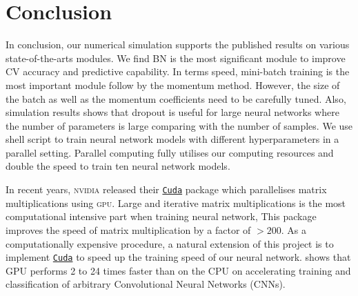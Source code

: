 \section{Conclusion}
In conclusion, our numerical simulation supports the published results on various state-of-the-arts modules. We find BN is the most significant module to improve CV accuracy and predictive capability. In terms speed, mini-batch training is the most important module follow by the momentum method. However, the size of the batch as well as the momentum coefficients need to be carefully tuned. Also, simulation results shows that dropout is useful for large neural networks where the number of parameters is large comparing with the number of samples. We use shell script to train neural network models with different hyperparameters in a parallel setting. Parallel computing fully utilises our computing resources and double the speed to train ten neural network models.

In recent years, \textsc{nvidia} released their \href{https://developer.nvidia.com/cuda-zone}{\texttt{Cuda}} package which parallelises matrix multiplications using \textsc{gpu}. Large and iterative matrix multiplications is the most computational intensive part when training neural network, This package improves the speed of matrix multiplication by a factor of $>200$. As a computationally expensive procedure, a natural extension of this project is to implement \href{https://developer.nvidia.com/cuda-zone}{\texttt{Cuda}} to speed up the training speed of our neural network. \citet{5452452} shows that GPU performs 2 to 24 times faster than on the CPU on accelerating training and classification of arbitrary Convolutional Neural Networks (CNNs).